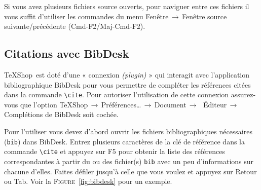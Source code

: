\documentclass[11pt,french]{article}
\newcommand{\TS}{\textsf{\TeX Shop}}
\newcommand{\cmd}[1]{\textsf{#1}}
\newcommand{\mnu}[1]{\textsf{#1}}
\newcommand{\To}{\,\(\to\)\,}
\begin{document}
Si vous avez plusieurs fichiers source ouverts, pour naviguer entre ces fichiers il vous suffit d'utiliser les commandes du menu \mnu{Fenêtre}\To\mnu{Fenêtre source suivante/précédente} (\cmd{Cmd-F2}/\cmd{Maj-Cmd-F2}).


\subsection{Citations avec \cmd{BibDesk}}

\TS\ est doté d'une « connexion \emph{(plugin)} » qui interagit avec l'application bibliographique \cmd{BibDesk} pour vous permettre de compléter les références citées dans la commande \verb|\cite|. Pour autoriser l'utilisation de cette connexion assurez-vous que l'option \mnu{TeXShop}\To\mnu{Préférences…}\To\mnu{Document}\To\ \mnu{Éditeur}\To\mnu{Complétions de BibDesk} soit cochée.

Pour l'utiliser vous devez d'abord ouvrir les fichiers bibliographiques nécessaires (\texttt{bib}) dans \cmd{BibDesk}. Entrez plusieurs caractères de la clé de référence dans la commande \verb|\cite| et appuyez sur \cmd{F5} pour obtenir la liste des références correspondantes à partir du ou des fichier(s) \texttt{bib} avec un peu d'informations sur chacune d'elles. Faites défiler jusqu'à celle que vous voulez et appuyez sur \cmd{Retour} ou \cmd{Tab}. Voir la \textsc{Figure}~\vref{fig:bibdesk} pour un exemple.
\end{document}
